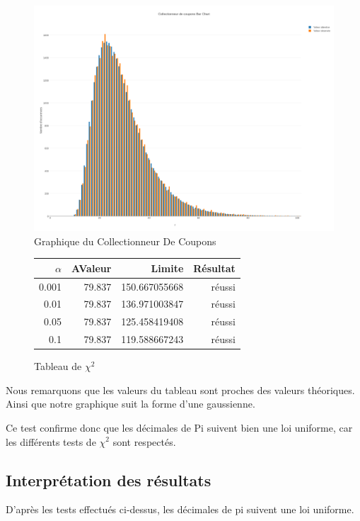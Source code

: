 \documentclass[10pt,a4paper]{article}
\begin{document}
\newpage

\begin{figure}[h]
		\centering
\includegraphics[scale=0.25]{../chart_images/collectionneur_de_coupons_bar_chart.png}
\caption{Graphique du Collectionneur De Coupons}
	\end{figure}

\begin{figure}[h]
		\centering
\begin{tabular}{|r|r|r|r|}
\hline
$\alpha$ & AValeur & Limite & Résultat\\
\hline
0.001 & 79.837 & 150.667055668 & réussi\\
0.01 & 79.837 & 136.971003847 & réussi\\
0.05 & 79.837 & 125.458419408 & réussi\\
0.1 & 79.837 & 119.588667243 & réussi\\
\hline
\end{tabular}
\caption{Tableau de $\chi^2$}
	\end{figure}
Nous remarquons que les valeurs du tableau sont proches des valeurs théoriques. Ainsi que notre graphique suit la forme d'une gaussienne. 

Ce test confirme donc que les décimales de Pi suivent bien une loi uniforme, car les différents tests de $\chi^2$ sont respectés.

\newpage
\subsection{Interprétation des résultats}
D'après les tests effectués ci-dessus, les décimales de pi suivent une loi uniforme.
	
\end{document}
